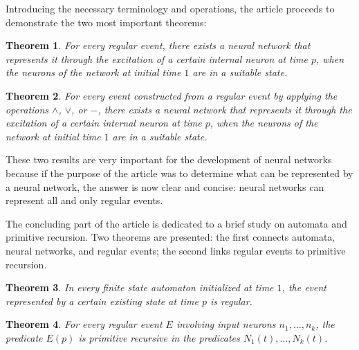 \documentclass[10pt]{article}
\newtheorem{thm}{Theorem}
\begin{document}
Introducing the necessary terminology and operations, the article proceeds to demonstrate the two most important theorems:

\begin{thm}
	For every regular event, there exists a neural network that represents it through the excitation of a certain internal neuron at time $p$, when the neurons of the network at initial time $1$ are in a suitable state.
\end{thm}

\begin{thm}
	For every event constructed from a regular event by applying the operations $\wedge$, $\vee$, or $-$, there exists a neural network that represents it through the excitation of a certain internal neuron at time $p$, when the neurons of the network at initial time $1$ are in a suitable state.
\end{thm}

These two results are very important for the development of neural networks because if the purpose of the article was to determine what can be represented by a neural network, the answer is now clear and concise: neural networks can represent all and only regular events.

The concluding part of the article is dedicated to a brief study on automata and primitive recursion. Two theorems are presented: the first connects automata, neural networks, and regular events; the second links regular events to primitive recursion.

\begin{thm}
	In every finite state automaton initialized at time $1$, the event represented by a certain existing state at time $p$ is regular.
\end{thm}

\begin{thm}
	For every regular event $E$ involving input neurons $n_1, \ldots, n_k$, the predicate $E(p)$ is primitive recursive in the predicates $N_1(t), \ldots, N_k(t)$.
\end{thm}
\end{document}

